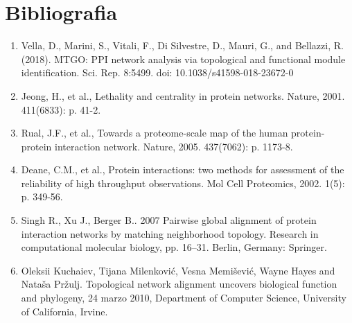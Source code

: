 \documentclass[11pt]{article}
\begin{document}
\section{Bibliografia} 
\begin{enumerate}
\item Vella, D., Marini, S., Vitali, F., Di Silvestre, D., Mauri, G., and Bellazzi, R. (2018). MTGO: PPI network analysis via topological and functional module identification. Sci. Rep. 8:5499. doi: 10.1038/s41598-018-23672-0

\item Jeong, H., et al., Lethality and centrality in protein networks. Nature, 2001. 411(6833): p. 41-2.

\item Rual, J.F., et al., Towards a proteome-scale map of the human protein-protein interaction network. Nature, 2005. 437(7062): p. 1173-8.

\item Deane, C.M., et al., Protein interactions: two methods for assessment of the reliability of high throughput observations. Mol Cell Proteomics, 2002. 1(5): p. 349-56.

\item Singh R., Xu J., Berger B.. 2007 Pairwise global alignment of protein interaction networks by matching neighborhood topology. Research in computational molecular biology, pp. 16–31. Berlin, Germany: Springer.

\item Oleksii Kuchaiev, Tijana Milenković, Vesna Memišević, Wayne Hayes and Nataša Pržulj. Topological network alignment uncovers biological function and phylogeny, 24 marzo 2010, Department of Computer Science, University of California, Irvine.


\end{enumerate}
\end{document}
